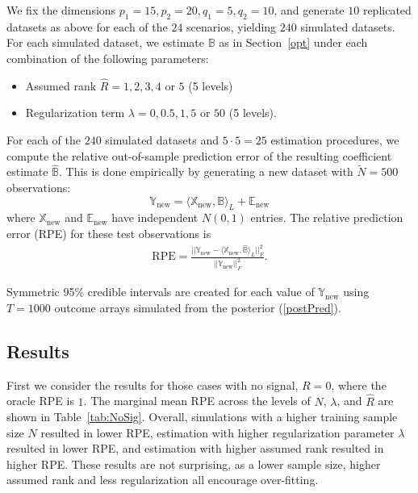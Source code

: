 \documentclass[12pt]{article}
\def\XX{\mathbb{X}}
\def\YY{\mathbb{Y}}
\def\EE{\mathbb{E}}
\def\BB{\mathbb{B}}
\def\new{\mbox{new}}
\newcommand{\tprod}[3] {
  \langle #1, #2 \rangle_{#3}}
\begin{document}
We fix the dimensions $p_1=15, p_2=20, q_1=5, q_2=10$, and generate $10$ replicated datasets as above for each of the $24$ scenarios, yielding $240$ simulated datasets.  For each simulated dataset, we estimate $\BB$ as in Section~\ref{opt} under each combination of the following parameters: 
\begin{itemize}
\item Assumed rank $\hat{R}=1,2,3,4$ or $5$ (5 levels)
\item Regularization term $\lambda = 0, 0.5, 1, 5$ or $50$ (5 levels).
\end{itemize}

For each of the $240$ simulated datasets and $5 \cdot 5 = 25$ estimation procedures, we compute the relative out-of-sample prediction error   of the resulting coefficient estimate $\hat{\BB}$.  This is done empirically by generating a new dataset with $\tilde{N}=500$ observations:  
\[\YY_{\new} = \tprod{\XX_{\new}}{\BB}{L} + \EE_{\new}\]
where $\XX_{\new}$ and $\EE_{\new}$ have independent $N(0,1)$ entries.  The relative prediction error (RPE) for these test observations is 
\begin{align}
\mbox{RPE} = \frac{||\YY_{\new}-\tprod{\XX_{\new}}{\hat{\BB}}{L} ||^2_F}{||\YY_{\new}||^2_F}. \label{RPE}
\end{align}

Symmetric 95\% credible intervals are created for each value of $\YY_{\new}$ using $T=1000$ outcome arrays simulated from the posterior (\ref{postPred}).    
 
\subsection{Results}
\label{sims_results}

First we consider the results for those cases with no signal, $R=0$, where the oracle RPE is $1$.  The marginal mean RPE across the levels of $N$, $\lambda$, and $\hat{R}$ are shown in Table~\ref{tab:NoSig}.  Overall, simulations with a higher training sample size $N$ resulted in lower RPE, estimation with higher regularization parameter $\lambda$ resulted in lower RPE, and estimation with higher assumed rank resulted in higher RPE.  These results are not surprising, as a lower sample size, higher assumed rank and less regularization all encourage over-fitting. 
\end{document}
